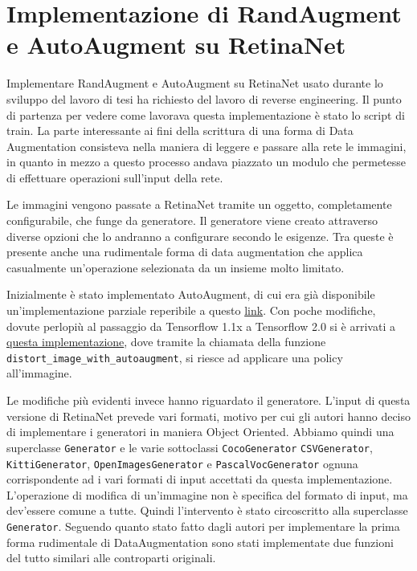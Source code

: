 \chapter{Implementazione di RandAugment e AutoAugment su RetinaNet}


Implementare RandAugment e AutoAugment su RetinaNet usato durante lo sviluppo del lavoro di tesi ha richiesto del lavoro di reverse engineering. Il punto di partenza per vedere come lavorava questa implementazione è stato lo script di train. La parte interessante ai fini della scrittura di una forma di Data Augmentation consisteva nella maniera di leggere e passare alla rete le immagini, in quanto in mezzo a questo processo andava piazzato un modulo che permetesse di effettuare operazioni sull'input della rete. 

Le immagini vengono passate a RetinaNet tramite un oggetto, completamente configurabile, che funge da generatore. Il generatore viene creato attraverso diverse opzioni che lo andranno a configurare secondo le esigenze. Tra queste è presente anche una rudimentale forma di data augmentation che applica casualmente un'operazione selezionata da un insieme molto limitato. 

Inizialmente è stato implementato AutoAugment, di cui era già disponibile un'implementazione parziale reperibile a questo \href{https://github.com/tensorflow/tpu/blob/master/models/official/detection/utils/autoaugment_utils.py}{link}. Con poche modifiche, dovute perlopiù al passaggio da Tensorflow 1.1x a Tensorflow 2.0 si è arrivati a \href{https://github.com/iskorini/keras-retinanet/blob/master/keras_retinanet/utils/autoaugment_utils_tf2.py}{questa implementazione}, dove tramite la chiamata della funzione \texttt{distort\_image\_with\_autoaugment}, si riesce ad applicare una policy all'immagine. 

Le modifiche più evidenti invece hanno riguardato il generatore. L'input di questa versione di RetinaNet prevede vari formati, motivo per cui gli autori hanno deciso di implementare i generatori in maniera Object Oriented. Abbiamo quindi una superclasse \texttt{Generator} e le varie sottoclassi \texttt{CocoGenerator} \texttt{CSVGenerator}, \texttt{KittiGenerator}, \texttt{OpenImagesGenerator} e \texttt{PascalVocGenerator} ognuna corrispondente ad i vari formati di input accettati da questa implementazione. L'operazione di modifica di un'immagine non è specifica del formato di input, ma dev'essere comune a tutte. Quindi l'intervento è stato circoscritto alla superclasse \texttt{Generator}. Seguendo quanto stato fatto dagli autori per implementare la prima forma rudimentale di DataAugmentation sono stati implementate due funzioni del tutto similari alle controparti originali. 


